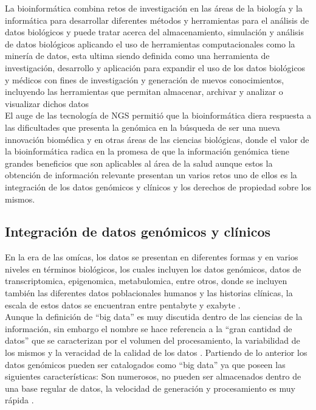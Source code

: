 {La bioinformática combina retos de investigación en las áreas de la biología y la informática para desarrollar diferentes métodos y herramientas para el análisis de datos biológicos y puede tratar acerca  del almacenamiento, simulación y análisis de datos biológicos aplicando el uso de herramientas computacionales  como la minería de datos, esta ultima siendo definida como una herramienta de investigación, desarrollo y aplicación para expandir el uso de los datos biológicos y médicos con fines de investigación y generación de nuevos conocimientos, incluyendo las herramientas que permitan almacenar, archivar y analizar o visualizar dichos datos \cite{Littlefield} \\

El auge de las tecnología de NGS permitió que la bioinformática diera respuesta a las dificultades que presenta la genómica en la búsqueda de ser una nueva innovación biomédica y en otras áreas de las ciencias biológicas, donde el valor de la bioinformática radica en la promesa de que la información genómica tiene grandes beneficios que son aplicables al área de la salud aunque estos la obtención de información relevante presentan un varios retos uno de ellos es la integración de los datos genómicos y clínicos y los derechos de propiedad sobre los mismos\cite{Searls2010}. 

\subsection{Integración de datos genómicos y clínicos}

En la era de las omícas, los datos se presentan en diferentes formas y en varios niveles en términos biológicos, los cuales incluyen los datos genómicos, datos de transcriptomica, epigenomica, metabulomica, entre otros, donde se incluyen también las diferentes datos poblacionales humanos y las historias clínicas, la escala de estos datos se encuentran  entre  pentabyte y exabyte \cite{Li2014}.\\

Aunque la definición de “big data” es muy discutida dentro de las ciencias de la información, sin embargo el nombre se hace referencia a la “gran cantidad de datos” que se caracterizan por el volumen del procesamiento, la variabilidad de los mismos y la veracidad de la calidad de los datos \cite{Li2014}. Partiendo de lo anterior los datos genómicos  pueden ser catalogados como “big data” ya que poseen las siguientes características: Son numerosos, no pueden ser almacenados dentro de una base regular de datos, la velocidad  de generación y procesamiento es muy rápida \cite{Hashem2015}. \\

}
